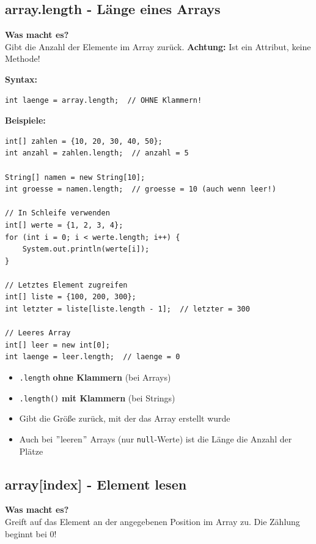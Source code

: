 \subsection*{array.length - Länge eines Arrays}

\textbf{Was macht es?}\\
Gibt die Anzahl der Elemente im Array zurück. \textbf{Achtung:} Ist ein Attribut, keine Methode!

\textbf{Syntax:}
\begin{lstlisting}
int laenge = array.length;  // OHNE Klammern!
\end{lstlisting}

\textbf{Beispiele:}
\begin{lstlisting}
int[] zahlen = {10, 20, 30, 40, 50};
int anzahl = zahlen.length;  // anzahl = 5

String[] namen = new String[10];
int groesse = namen.length;  // groesse = 10 (auch wenn leer!)

// In Schleife verwenden
int[] werte = {1, 2, 3, 4};
for (int i = 0; i < werte.length; i++) {
    System.out.println(werte[i]);
}

// Letztes Element zugreifen
int[] liste = {100, 200, 300};
int letzter = liste[liste.length - 1];  // letzter = 300

// Leeres Array
int[] leer = new int[0];
int laenge = leer.length;  // laenge = 0
\end{lstlisting}

\begin{achtung}
	\begin{itemize}
		\item \texttt{.length} \textbf{ohne Klammern} (bei Arrays)
		\item \texttt{.length()} \textbf{mit Klammern} (bei Strings)
		\item Gibt die Größe zurück, mit der das Array erstellt wurde
		\item Auch bei \("\)leeren\("\) Arrays (nur \texttt{null}-Werte) ist die Länge die Anzahl der Plätze
	\end{itemize}
\end{achtung}

\newpage


\subsection*{array[index] - Element lesen}

\textbf{Was macht es?}\\
Greift auf das Element an der angegebenen Position im Array zu. Die Zählung beginnt bei 0!

